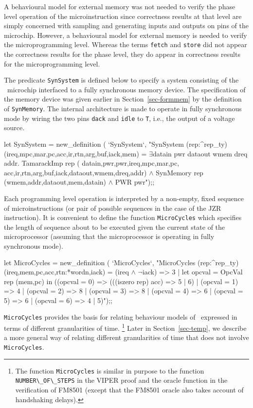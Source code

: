 A behavioural model for external memory was not needed to verify
the phase level operation of the microinstruction since
correctness results at that level are simply concerned with
sampling and generating inputs and outputs on pins of the microchip.
However, a behavioural model for external memory is needed to verify
the microprogramming level.
Whereas the terms \verb"fetch" and \verb"store"
did not appear the correctness results for the phase level,
they do appear in
correctness results for the microprogramming level.

The predicate \verb"SynSystem" is defined below to specify
a system consisting of the \Tamarack\ microchip interfaced to
a fully synchronous memory device.
The specification of the memory device was given earlier in
Section~\ref{sec-formmem}
by the definition of \verb"SynMemory".
The internal architecture is made to operate in fully synchronous mode
by wiring the two pins \verb"dack" and \verb"idle" to \verb"T", i.e.,
the output of a voltage source.

\begintt
let SynSystem = new_definition (
  `SynSystem`,
  "SynSystem (rep:^rep_ty)
    (ireq,mpc,mar,pc,acc,ir,rtn,arg,buf,iack,mem) =
    \(\exists\)datain pwr dataout wmem dreq addr.
      TamarackImp rep (
        datain,pwr,pwr,ireq,mpc,mar,pc,
        acc,ir,rtn,arg,buf,iack,dataout,wmem,dreq,addr) \(\wedge\)
      SynMemory rep (wmem,addr,dataout,mem,datain) \(\wedge\)
      PWR pwr");;
\endtt

Each programming level operation is interpreted by a non-empty,
fixed sequence of microinstructions (or pair of possible sequences
in the case of the JZR instruction).
It is convenient to define the function \verb"MicroCycles"
which specifies the length of sequence about to be executed
given the current state of the microprocessor
(assuming that the microprocessor is operating in fully synchronous mode).

\begintt
let MicroCycles = new_definition (
  `MicroCycles`,
  "MicroCycles (rep:^rep_ty) (ireq,mem,pc,acc,rtn:*wordn,iack) =
    (ireq \(\wedge\) \(\neg\)iack) => 3 |
    let opcval = OpcVal rep (mem,pc) in
    ((opcval = 0) => (((iszero rep) acc) => 5 | 6) |
     (opcval = 1) => 4 |
     (opcval = 2) => 8 |
     (opcval = 3) => 8 |
     (opcval = 4) => 6 |
     (opcval = 5) => 6 |
     (opcval = 6) => 4 |
                     5)");;
\endtt

\verb"MicroCycles"
provides the basis for relating behaviour models of \Tamarack\
expressed in terms of different granularities of time.
\footnote{
The function \verb"MicroCycles" is similar in purpose to the
function \mbox{\footnotesize \verb"NUMBER\_OF\_STEPS"}
in the \mbox{\footnotesize VIPER} proof and the oracle function
in the verification of \mbox{\footnotesize FM8501}
(except that the \mbox{\footnotesize FM8501} oracle
also takes account of handshaking delays).}
Later in Section~\ref{sec-temp},
we describe a more general way of relating
different granularities of time that does not involve
\verb"MicroCycles".

